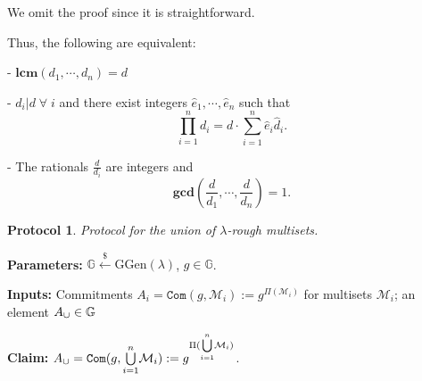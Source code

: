 \documentclass[11pt, lettersize, notitlepage, leqno, footskip=0.6cm]{article}
\newcommand{\pl}{\prod\limits}
\newcommand{\slim}{\sum\limits}
\newcommand{\ttt}{\texttt}
\newcommand{\mc}{\mathcal}
\newcommand{\mb}{\mathbb}
\newcommand{\mbf}{\mathbf}
\newcommand{\mr}{\mathrm}
\newcommand{\lam}{\lambda}
\newcommand{\lamb}{\lambda}
\newcommand{\what}{\widehat}
\newcommand{\vs}{\vspace{-0.15cm}}
\newcommand{\noin}{\noindent}
\newcommand{\LCM}{\mbf{lcm}}
\newcommand{\GCD}{\mbf{gcd}}
\newtheorem{Prot}[Thm]{Protocol}
\numberwithin{equation}{section}
\begin{document}
\begin{prf} We omit the proof since it is straightforward. \end{prf}

\begin{comment}
Let $p$ be a prime and let $\mr{val}_p(N)$ denote the largest integer $x$ such that $p^x$ divides $N$. Write $k_i:= \mr{val}_p(d_i)$ for brevity. Then $\mr{val}_p(\pl_{i=1}^n d_i) = \slim_{i=1}^n k_i$ and $\mr{val}_p(\what{d}_j) = (\slim_{i=1}^n k_i)-k_i$. Hence, \vs $$\mr{val}_p(\GCD(\what{d}_1,\cdots,\what{d}_n)) = \min\big((\slim_{i=1}^n k_i)-k_i\big)_i = \slim_{i=1}^n k_i - \max(k_1,\cdots,k_n).$$ On the other hand, \vs $$\mr{val}_p(\LCM(d_1,\cdots,d_n)) = \max(k_1,\cdots,k_n).$$ Thus, \vs $$\mr{val}_p(\LCM(d_1,\cdots,d_n))+ \mr{val}_p(\GCD(\what{d}_1,\cdots,\what{d}_n)) = \mr{val}_p(\pl_{i=1}^n d_i),$$ which completes the proof. \end{comment}


Thus, the following are equivalent:\vspace{0.1cm}

\noin - $\LCM(d_1,\cdots,d_n) = d$

\noin - $d_i\big| d\;\forall\; i$ and there exist integers $\what{e}_1,\cdots,\what{e}_n$ such that \vs $$\pl_{i=1}^n d_i  =  d\cdot\slim_{i=1}^n \what{e}_i\what{d}_i.$$

\noin - The rationals $\frac{d}{d_i}$ are integers and \vs $$\GCD(\frac{d}{d_1},\cdots,\frac{d}{d_n}) = 1 .$$

\vspace{0.1cm}

\begin{Prot} Protocol for the union of $\lam$-rough multisets.\end{Prot} \vspace{-0.3cm}

\noin \textbf{Parameters:} $\mb{G}\xleftarrow{\$} \mr{GGen}(\lamb)$,\; $g\in \mb{G}$.

\noin \textbf{Inputs:} Commitments $A_i = \ttt{Com}(g, \mc{M}_i) := g^{\Pi(\mc{M}_i)}$ for multisets $\mc{M}_i$; an element $A_{\tt{\cup}}\in\mb{G}$

\noin \textbf{Claim:} $A_{\tt{\cup}} = \protect{\verb|Com|}(g, {\bigcup\limits_{i=1}^n} \mc{M}_i) := g^{\Pi({\bigcup\limits_{i=1}^n} \mc{M}_i)}$.
\end{document}
